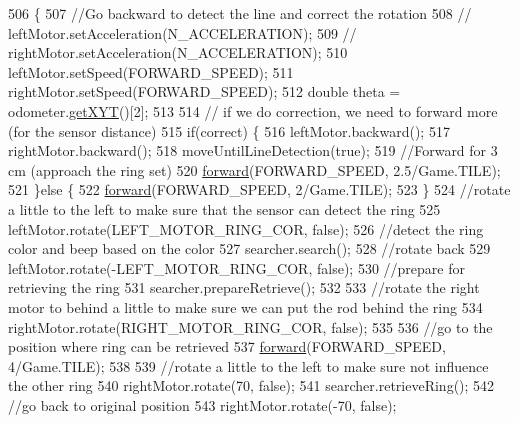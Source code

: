 \begin{DoxyCode}
506                                                                                    \{
507     \textcolor{comment}{//Go backward to detect the line and correct the rotation}
508 \textcolor{comment}{//    leftMotor.setAcceleration(N\_ACCELERATION);}
509 \textcolor{comment}{//    rightMotor.setAcceleration(N\_ACCELERATION);}
510     leftMotor.setSpeed(FORWARD\_SPEED);
511     rightMotor.setSpeed(FORWARD\_SPEED);
512     \textcolor{keywordtype}{double} theta = odometer.\hyperlink{classca_1_1mcgill_1_1ecse211_1_1odometer_1_1_odometer_data_a8f40f0264c68f0cbed4fff1723ae7863}{getXYT}()[2];
513     
514     \textcolor{comment}{// if we do correction, we need to forward more (for the sensor distance)}
515     \textcolor{keywordflow}{if}(correct) \{
516       leftMotor.backward();
517       rightMotor.backward();
518       moveUntilLineDetection(\textcolor{keyword}{true});
519       \textcolor{comment}{//Forward for 3 cm (approach the ring set)}
520       \hyperlink{classca_1_1mcgill_1_1ecse211_1_1project_1_1_navigation_a7c66610c5b7496ddb35d342ab2cd3f08}{forward}(FORWARD\_SPEED, 2.5/Game.TILE);
521     \}\textcolor{keywordflow}{else} \{
522       \hyperlink{classca_1_1mcgill_1_1ecse211_1_1project_1_1_navigation_a7c66610c5b7496ddb35d342ab2cd3f08}{forward}(FORWARD\_SPEED, 2/Game.TILE);
523     \}
524     \textcolor{comment}{//rotate a little to the left to make sure that the sensor can detect the ring}
525     leftMotor.rotate(LEFT\_MOTOR\_RING\_COR, \textcolor{keyword}{false});
526     \textcolor{comment}{//detect the ring color and beep based on the color}
527     searcher.search();
528     \textcolor{comment}{//rotate back}
529     leftMotor.rotate(-LEFT\_MOTOR\_RING\_COR, \textcolor{keyword}{false});
530     \textcolor{comment}{//prepare for retrieving the ring }
531     searcher.prepareRetrieve();
532     
533     \textcolor{comment}{//rotate the right motor to behind a little to make sure we can put the rod behind the ring}
534     rightMotor.rotate(RIGHT\_MOTOR\_RING\_COR, \textcolor{keyword}{false});
535     
536     \textcolor{comment}{//go to the position where ring can be retrieved}
537     \hyperlink{classca_1_1mcgill_1_1ecse211_1_1project_1_1_navigation_a7c66610c5b7496ddb35d342ab2cd3f08}{forward}(FORWARD\_SPEED, 4/Game.TILE);
538     
539     \textcolor{comment}{//rotate a little to the left to make sure not influence the other ring}
540     rightMotor.rotate(70, \textcolor{keyword}{false});
541     searcher.retrieveRing();
542     \textcolor{comment}{//go back to original position}
543     rightMotor.rotate(-70, \textcolor{keyword}{false});

\end{DoxyCode}
